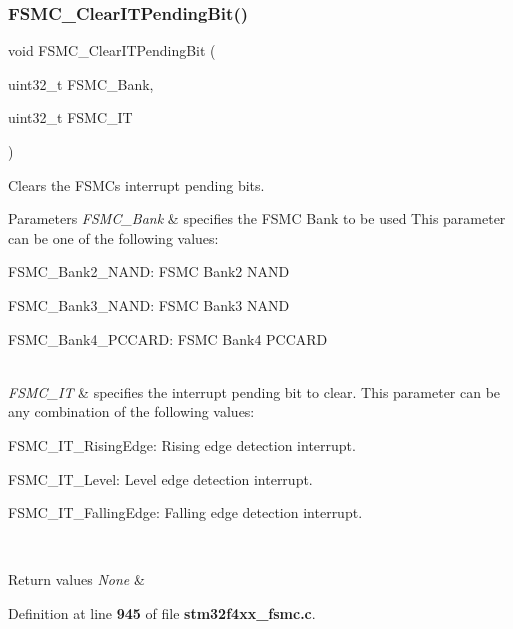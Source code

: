 \subsubsection{F\+S\+M\+C\+\_\+\+Clear\+I\+T\+Pending\+Bit()}
{\footnotesize\ttfamily void F\+S\+M\+C\+\_\+\+Clear\+I\+T\+Pending\+Bit (\begin{DoxyParamCaption}\item[{uint32\+\_\+t}]{F\+S\+M\+C\+\_\+\+Bank,  }\item[{uint32\+\_\+t}]{F\+S\+M\+C\+\_\+\+IT }\end{DoxyParamCaption})}



Clears the F\+S\+MC\textquotesingle{}s interrupt pending bits. 


\begin{DoxyParams}{Parameters}
{\em F\+S\+M\+C\+\_\+\+Bank} & specifies the F\+S\+MC Bank to be used This parameter can be one of the following values\+: \begin{DoxyItemize}
\item F\+S\+M\+C\+\_\+\+Bank2\+\_\+\+N\+A\+ND\+: F\+S\+MC Bank2 N\+A\+ND \item F\+S\+M\+C\+\_\+\+Bank3\+\_\+\+N\+A\+ND\+: F\+S\+MC Bank3 N\+A\+ND \item F\+S\+M\+C\+\_\+\+Bank4\+\_\+\+P\+C\+C\+A\+RD\+: F\+S\+MC Bank4 P\+C\+C\+A\+RD \end{DoxyItemize}
\\
\hline
{\em F\+S\+M\+C\+\_\+\+IT} & specifies the interrupt pending bit to clear. This parameter can be any combination of the following values\+: \begin{DoxyItemize}
\item F\+S\+M\+C\+\_\+\+I\+T\+\_\+\+Rising\+Edge\+: Rising edge detection interrupt. \item F\+S\+M\+C\+\_\+\+I\+T\+\_\+\+Level\+: Level edge detection interrupt. \item F\+S\+M\+C\+\_\+\+I\+T\+\_\+\+Falling\+Edge\+: Falling edge detection interrupt. \end{DoxyItemize}
\\
\hline
\end{DoxyParams}

\begin{DoxyRetVals}{Return values}
{\em None} & \\
\hline
\end{DoxyRetVals}


Definition at line \textbf{ 945} of file \textbf{ stm32f4xx\+\_\+fsmc.\+c}.


